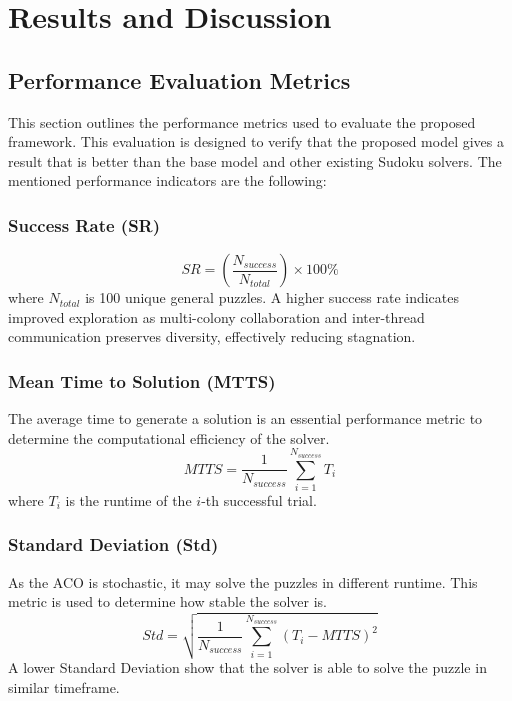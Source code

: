 \chapter{Results and Discussion}\label{chap:Results}

\section{Performance Evaluation Metrics}

This section outlines the performance metrics used to evaluate the proposed framework. This evaluation is designed to verify that the proposed model gives a result that is better than the base model and other existing Sudoku solvers. The mentioned performance indicators are the following:

\subsection*{Success Rate (SR)}
        \begin{equation}
        SR = \left( \frac{N_{success}}{N_{total}} \right) \times 100\%
        \end{equation}
        where $N_{total}$ is 100 unique general puzzles. A higher success rate indicates improved exploration as multi-colony collaboration and inter-thread communication preserves diversity, effectively reducing stagnation.     

\subsection*{Mean Time to Solution (MTTS)}
        The average time to generate a solution is an essential performance metric to determine the computational efficiency of the solver. 
        \begin{equation}
        MTTS = \frac{1}{N_{success}} \sum_{i=1}^{N_{success}} T_i
        \end{equation}
        where $T_i$ is the runtime of the $i$-th successful trial. 

\subsection*{Standard Deviation (Std)}
        As the ACO is stochastic, it may solve the puzzles in different runtime. This metric is used to determine how stable the solver is. 
        \begin{equation}
        Std = \sqrt{\frac{1}{N_{success}} \sum_{i=1}^{N_{success}} (T_i - MTTS)^2}
        \end{equation}
        A lower Standard Deviation show that the solver is able to solve the puzzle in similar timeframe. 

